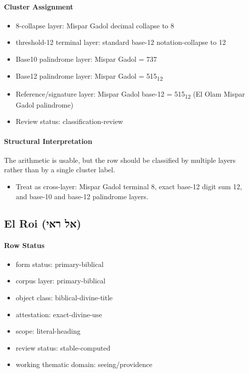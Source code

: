 \paragraph{Cluster Assignment}
\begin{itemize}
\item 8-collapse layer: Mispar Gadol decimal collapse to 8
\item threshold-12 terminal layer: standard base-12 notation-collapse to 12
\item Base10 palindrome layer: Mispar Gadol = 737
\item Base12 palindrome layer: Mispar Gadol = 515\textsubscript{12}
\item Reference/signature layer: Mispar Gadol base-12 = 515\textsubscript{12} (El Olam Mispar Gadol palindrome)
\item Review status: classification-review
\end{itemize}
\paragraph{Structural Interpretation}
The arithmetic is usable, but the row should be classified by multiple layers rather than by a single cluster label.

\begin{itemize}
\item Treat as cross-layer: Mispar Gadol terminal 8, exact base-12 digit sum 12, and base-10 and base-12 palindrome layers.
\end{itemize}

\subsection{El Roi (אל ראי)}
\paragraph{Row Status}
\begin{itemize}
\item form status: primary-biblical
\item corpus layer: primary-biblical
\item object class: biblical-divine-title
\item attestation: exact-divine-use
\item scope: literal-heading
\item review status: stable-computed
\item working thematic domain: seeing/providence
\end{itemize}
